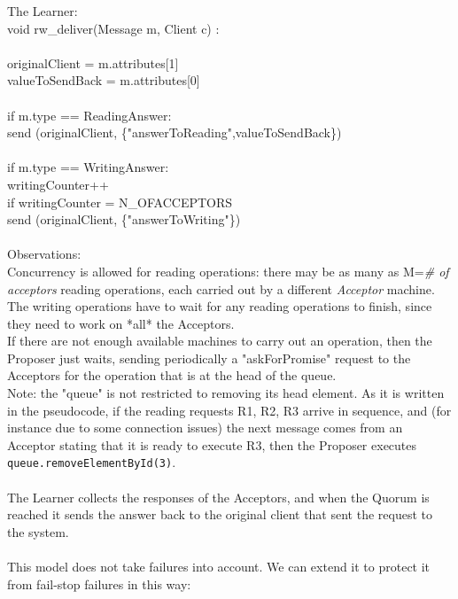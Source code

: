 \documentclass[paper=a4, fontsize=11pt]{scrartcl} %
\numberwithin{equation}{section} %
\numberwithin{figure}{section} %
\numberwithin{table}{section} %
\begin{document}
The Learner:\\
{\selectfont 
void rw\_deliver(Message m, Client c) : \\
~\\
\quad \quad originalClient = m.attributes[1] \\
\quad \quad valueToSendBack = m.attributes[0] \\
~\\
\quad \quad if m.type == ReadingAnswer: \\
\quad \quad \quad \quad send (originalClient, \{"answerToReading",valueToSendBack\}) \\
~\\
\quad \quad if m.type == WritingAnswer: \\ 
\quad \quad \quad \quad writingCounter++ \\
\quad \quad \quad \quad if writingCounter = N\_OFACCEPTORS \\
\quad \quad \quad \quad \quad \quad send (originalClient, \{"answerToWriting"\}) \\

}
~\\
Observations:\\
Concurrency is allowed for reading operations: there may be as many as M=\textit{\# of acceptors} reading operations, each carried out by a different \textit{Acceptor} machine. \\
The writing operations have to wait for any reading operations to finish, since they need to work on *all* the Acceptors.\\
If there are not enough available machines to carry out an operation, then the Proposer just waits, sending periodically a "askForPromise" request to the Acceptors for the operation that is at the head of the queue.\\
Note: the "queue" is not restricted to removing its head element. As it is written in the pseudocode, if the reading requests R1, R2, R3 arrive in sequence, and (for instance due to some connection issues) the next message comes from an Acceptor stating that it is ready to execute R3, then the Proposer executes \verb|queue.removeElementById(3)|. \\
~\\
The Learner collects the responses of the Acceptors, and when the Quorum is reached it sends the answer back to the original client that sent the request to the system.\\
~\\
This model does not take failures into account. We can extend it to protect it from fail-stop failures in this way:\\
\end{document}
